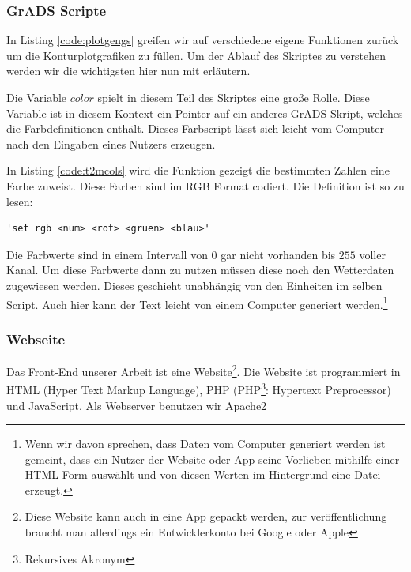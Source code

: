 \documentclass[a4paper,oneside,12pt,titlepage]{article}
\newcommand{\pyvidir}{../../Code/PyVi/}	%
\begin{document}
\subsubsection*{GrADS Scripte}


In Listing \ref{code:plotgengs} greifen wir auf verschiedene eigene Funktionen zurück um die Konturplotgrafiken zu füllen. Um der Ablauf des Skriptes zu verstehen werden wir die wichtigsten hier nun mit erläutern.

Die Variable $color$ spielt in diesem Teil des Skriptes eine große Rolle. Diese Variable ist in diesem Kontext ein Pointer auf ein anderes GrADS Skript, welches die Farbdefinitionen enthält. Dieses Farbscript lässt sich leicht vom Computer nach den Eingaben eines Nutzers erzeugen.

In Listing \ref{code:t2mcols} wird die Funktion gezeigt die bestimmten Zahlen eine Farbe zuweist. Diese Farben sind im RGB Format codiert. Die Definition ist so zu lesen:

\begin{lstlisting}[language=grads]
	'set rgb <num> <rot> <gruen> <blau>'
\end{lstlisting}

Die Farbwerte sind in einem Intervall von $0$ gar nicht vorhanden bis $255$ voller Kanal. Um diese Farbwerte dann zu nutzen müssen diese noch den Wetterdaten zugewiesen werden. Dieses geschieht unabhängig von den Einheiten im selben Script. Auch hier kann der Text leicht von einem Computer generiert werden.\footnote{Wenn wir davon sprechen, dass Daten vom Computer generiert werden ist gemeint, dass ein Nutzer der Website oder App seine Vorlieben mithilfe einer HTML-Form auswählt und von diesen Werten im Hintergrund eine Datei erzeugt.}


\subsubsection*{Webseite}
Das Front-End unserer Arbeit ist eine Website\footnote{Diese Website kann auch in eine App gepackt werden, zur veröffentlichung braucht man allerdings ein Entwicklerkonto bei Google oder Apple}. Die Website ist programmiert in HTML (Hyper Text Markup Language), PHP (PHP\footnote{Rekursives Akronym}: Hypertext Preprocessor) und JavaScript. Als Webserver benutzen wir Apache2 \cite{php} \cite{apache} \\
\end{document}
